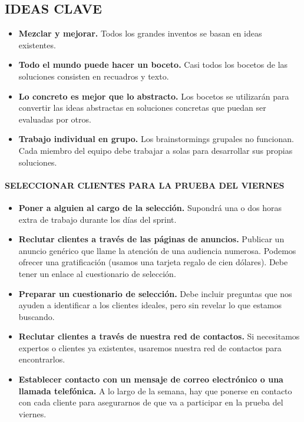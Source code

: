 \documentclass[10pt]{article}
\begin{document}
\begin{multicols}{2}
\subsection*{IDEAS CLAVE}
\begin{itemize}
\item \textbf{Mezclar y mejorar.} Todos los grandes inventos se basan en ideas existentes.
\item \textbf{Todo el mundo puede hacer un boceto.} Casi todos los bocetos de las soluciones consisten en recuadros y texto.
\item \textbf{Lo concreto es mejor que lo abstracto.} Los bocetos se utilizarán para convertir las ideas abstractas en soluciones concretas que puedan ser evaluadas por otros.
\item \textbf{Trabajo individual en grupo.} Los brainstormings grupales no funcionan. Cada miembro del equipo debe trabajar a solas para desarrollar sus propias soluciones.
\end{itemize}
\paragraph{SELECCIONAR CLIENTES PARA LA PRUEBA DEL VIERNES}
\begin{itemize}
\item \textbf{Poner a alguien al cargo de la selección.} Supondrá una o dos horas extra de trabajo durante los días del sprint.
\item \textbf{Reclutar clientes a través de las páginas de anuncios.} Publicar un anuncio genérico que llame la atención de una audiencia numerosa. Podemos ofrecer una gratificación (usamos una tarjeta regalo de cien dólares). Debe tener un enlace al cuestionario de selección.
\item \textbf{Preparar un cuestionario de selección.} Debe incluir preguntas que nos ayuden a identificar a los clientes ideales, pero sin revelar lo que estamos buscando.
\item \textbf{Reclutar clientes a través de nuestra red de contactos.} Si necesitamos expertos o clientes ya existentes, usaremos nuestra red de contactos para encontrarlos.
\item \textbf{Establecer contacto con un mensaje de correo electrónico o una llamada telefónica.} A lo largo de la semana, hay que ponerse en contacto con cada cliente para asegurarnos de que va a participar en la prueba del viernes.
\end{itemize}
\end{multicols}
\end{document}
